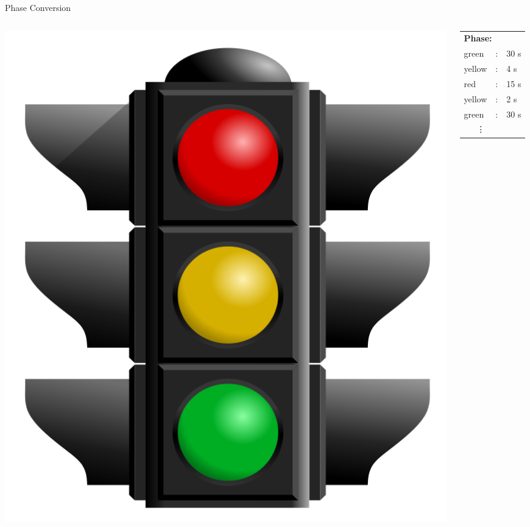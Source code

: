 \begin{frame}{Phase Conversion}
\begin{columns}
	\begin{column}{0.3\textwidth}
	\begin{center}
	\includegraphics[width=1\textwidth]{images/traffic_light.png}
	\end{center}
	\end{column}

	\begin{column}{0.4\textwidth}
	\begin{center}
	\begin{tabular}{lll}
	\multicolumn{3}{l}{\textbf{Phase:}} \\
	green & : & 30 s \\
	yellow & : &  4 s \\
	red & : & 15 s \\
	yellow & : & 2 s \\
	green & : & 30 s\\
	\ \ \ \vdots&&\\
	\end{tabular}
	\end{center}
	\end{column}


\end{columns}
\end{frame}
